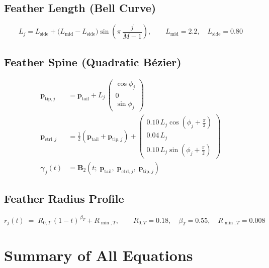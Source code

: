 \documentclass[12pt,a4paper]{article}
\newcommand{\vv}[1]{\bm{#1}}          %
\begin{document}
\subsection{Feather Length (Bell Curve)}
\begin{equation}
  L_j
  = L_{\mathrm{side}}
  + \bigl(L_{\mathrm{mid}} - L_{\mathrm{side}}\bigr)
    \sin\!\left(\pi\,\frac{j}{M-1}\right),
  \qquad
  L_{\mathrm{mid}} = 2.2,\quad L_{\mathrm{side}} = 0.80
\end{equation}

\subsection{Feather Spine (Quadratic Bézier)}
\begin{align}
  \vv{p}_{\mathrm{tip},j}
  &= \vv{p}_{\mathrm{tail}}
     + L_j\,
     \begin{pmatrix}\cos\phi_j \\ 0 \\ \sin\phi_j\end{pmatrix}
  \\[6pt]
  \vv{p}_{\mathrm{ctrl},j}
  &= \tfrac{1}{2}\!\left(\vv{p}_{\mathrm{tail}}+\vv{p}_{\mathrm{tip},j}\right)
     + \begin{pmatrix}
         0.10\,L_j\cos(\phi_j+\tfrac{\pi}{2})\\
         0.04\,L_j \\
         0.10\,L_j\sin(\phi_j+\tfrac{\pi}{2})
       \end{pmatrix}
  \\[6pt]
  \vv{\gamma}_j(t)
  &= \vv{B}_2\!\left(t;\;
       \vv{p}_{\mathrm{tail}},\;
       \vv{p}_{\mathrm{ctrl},j},\;
       \vv{p}_{\mathrm{tip},j}
     \right)
\end{align}

\subsection{Feather Radius Profile}
\begin{equation}
  r_j(t)
  \;=\;
  R_{0,T}\,(1-t)^{\,\beta_T}
  + R_{\min,T},
  \qquad
  R_{0,T} = 0.18,\quad
  \beta_T  = 0.55,\quad
  R_{\min,T} = 0.008
\end{equation}

\section{Summary of All Equations}
\end{document}
